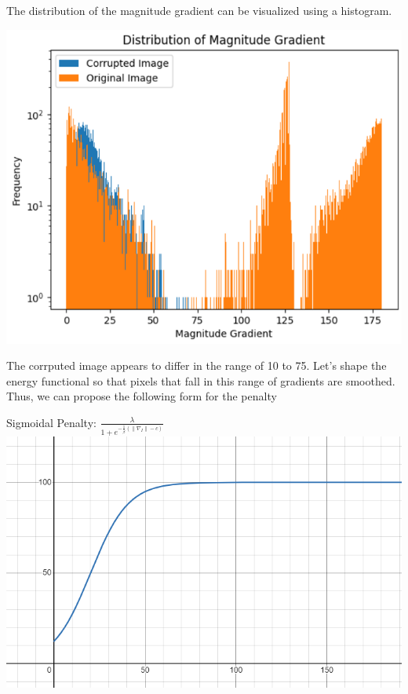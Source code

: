 \documentclass{article}
\begin{document}
  \newpage
  \noindent
  The distribution of the magnitude gradient can be visualized using a histogram.
  \begin{center}
    \includegraphics[scale=0.5]{../report_images/gradient.png}
  \end{center}
  \vspace{12pt}

  \noindent
  The corrputed image appears to differ in the range of 10 to 75.
  Let's shape the energy functional so that pixels that
  fall in this range of gradients are smoothed. Thus, we
  can propose the following form for the penalty
  \begin{center}
    Sigmoidal Penalty: $\frac{\lambda}{1+e^{-\frac{1}{\beta}(\| \nabla_{I} \|-c)}}$\\
    \vspace{12pt}
    \includegraphics[scale=0.5]{../report_images/sigmoid.png}
  \end{center}
  \vspace{12pt}
\end{document}
